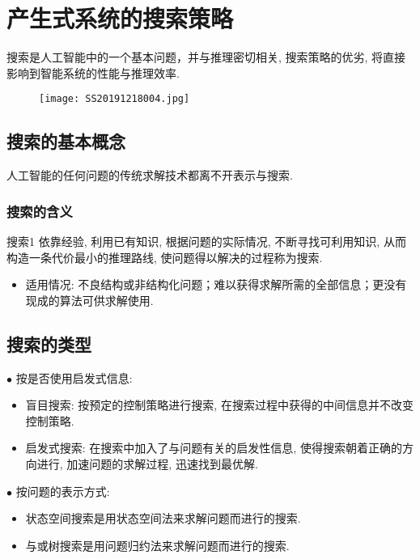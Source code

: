 \chapter{产生式系统的搜索策略}\label{AIchap4}
\begin{tcolorbox}[colback=white!50,colframe=orange!50,title=搜索]
搜索是人工智能中的一个基本问题，并与推理密切相关, 搜索策略的优劣, 将直接影响到智能系统的性能与推理效率.\hfill
\end{tcolorbox}
\begin{figure}[H]
\centering
\texttt{[image: SS20191218004.jpg]}
\label{SS20191218004}
\end{figure}
\section{搜索的基本概念}
    人工智能的任何问题的传统求解技术都离不开表示与搜索.
\subsection{搜索的含义}
\begin{mydef}{搜索}{1}
依靠经验, 利用已有知识, 根据问题的实际情况, 不断寻找可利用知识, 从而构造一条代价最小的推理路线, 使问题得以解决的过程称为搜索.
\end{mydef}

\begin{itemize}
\item 适用情况: 不良结构或非结构化问题；难以获得求解所需的全部信息；更没有现成的算法可供求解使用.
\end{itemize}

\section{搜索的类型}

    $\bullet$ 按是否使用启发式信息:
    \begin{itemize}
        \item 盲目搜索: 按预定的控制策略进行搜索, 在搜索过程中获得的中间信息并不改变控制策略.
        \item 启发式搜索: 在搜索中加入了与问题有关的启发性信息, 使得搜索朝着正确的方向进行, 加速问题的求解过程, 迅速找到最优解.
    \end{itemize}
    $\bullet$ 按问题的表示方式:
    \begin{itemize}
        \item 状态空间搜索是用状态空间法来求解问题而进行的搜索.
        \item 与或树搜索是用问题归约法来求解问题而进行的搜索.
    \end{itemize}


